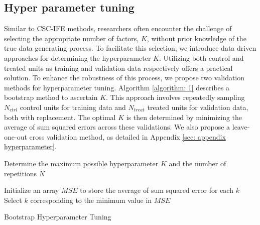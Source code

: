 \documentclass[12pt]{article}
\begin{document}
\subsection{Hyper parameter tuning}
Similar to CSC-IFE methods, researchers often encounter the challenge of selecting the appropriate number of factors, $K$, without prior knowledge of the true data generating process. To facilitate this selection, we introduce data driven approaches for determining the hyperparameter $K$. Utilizing both control and treated units as training and validation data respectively offers a practical solution. To enhance the robustness of this process, we propose two validation methods for hyperparameter tuning. Algorithm \ref{algorithm: 1} describes a bootstrap method to ascertain $K$. This approach involves repeatedly sampling $N_{ctrl}$ control units for training data and $N_{treat}$ treated units for validation data, both with replacement. The optimal $K$ is then determined by minimizing the average of sum squared errors across these validations. We also propose a leave-one-out cross validation method, as detailed in Appendix \ref{sec: appendix hyperparameter}.

\begin{algorithm}[!ht]
    \SetAlgoLined
    Determine the maximum possible hyperparameter $K$ and the number of repetitions $N$\;

    Initialize an array $MSE$ to store the average of sum squared error for each $k$\;
    Select $k$ corresponding to the minimum value in $MSE$\;
    \caption{Bootstrap Hyperparameter Tuning}
    \label{algorithm: 1}
\end{algorithm}
\end{document}
